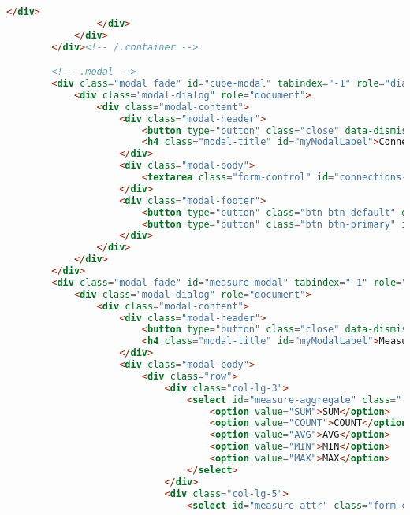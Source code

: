 \begin{lstlisting}[language=HTML,basicstyle=\tiny,caption=reporting.html]
                    </div>
                </div>
            </div>
        </div><!-- /.container -->

        <!-- .modal -->
        <div class="modal fade" id="cube-modal" tabindex="-1" role="dialog" aria-labelledby="CubeModal">
            <div class="modal-dialog" role="document">
                <div class="modal-content">
                    <div class="modal-header">
                        <button type="button" class="close" data-dismiss="modal" aria-label="Close"><span aria-hidden="true">&times;</span></button>
                        <h4 class="modal-title" id="myModalLabel">Connection & Cube</h4>
                    </div>
                    <div class="modal-body">
                        <textarea class="form-control" id="connections-editor" rows="20"></textarea>
                    </div>
                    <div class="modal-footer">
                        <button type="button" class="btn btn-default" data-dismiss="modal">Close</button>
                        <button type="button" class="btn btn-primary" id="save-connections">Save changes</button>
                    </div>
                </div>
            </div>
        </div>
        <div class="modal fade" id="measure-modal" tabindex="-1" role="dialog" aria-labelledby="MeasureModal">
            <div class="modal-dialog" role="document">
                <div class="modal-content">
                    <div class="modal-header">
                        <button type="button" class="close" data-dismiss="modal" aria-label="Close"><span aria-hidden="true">&times;</span></button>
                        <h4 class="modal-title" id="myModalLabel">Measure</h4>
                    </div>
                    <div class="modal-body">
                        <div class="row">
                            <div class="col-lg-3">
                                <select id="measure-aggregate" class="form-control">
                                    <option value="SUM">SUM</option>
                                    <option value="COUNT">COUNT</option>
                                    <option value="AVG">AVG</option>
                                    <option value="MIN">MIN</option>
                                    <option value="MAX">MAX</option>
                                </select>
                            </div>
                            <div class="col-lg-5">
                                <select id="measure-attr" class="form-control">


\end{lstlisting}
